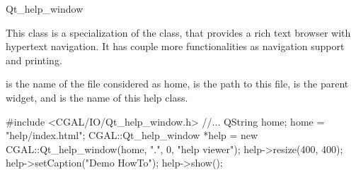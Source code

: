 
\begin{ccRefClass}{Qt_help_window}

\ccDefinition
This class is a specialization of the  class, that
provides a rich text browser with hypertext navigation. It has couple
more functionalities as navigation support and printing.

\ccGlue

\ccInheritsFrom
{}

\ccCreation
{}
{ is the name of the file considered as home,  is 
the path to this file,  is the parent widget, and
 is the name of this help class.}




\ccExample
\begin{ccExampleCode}
  #include <CGAL/IO/Qt_help_window.h>
  //...
  QString home;
  home = "help/index.html";
  CGAL::Qt_help_window *help = new 
    CGAL::Qt_help_window(home, ".", 0, "help viewer");
  help->resize(400, 400);
  help->setCaption("Demo HowTo");
  help->show();
\end{ccExampleCode}

\end{ccRefClass}


